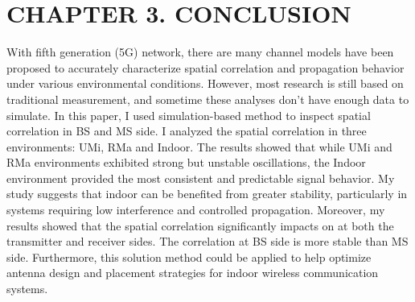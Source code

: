 \documentclass{article} %
\begin{document}
\clearpage

\section*{CHAPTER 3. CONCLUSION}
With fifth generation (5G) network, there are many channel models have been proposed to accurately characterize spatial correlation and propagation behavior under various environmental conditions. However, most research is still based on traditional measurement, and sometime these analyses don’t have enough data to simulate. In this paper, I used simulation-based method to inspect spatial correlation in BS and MS side. I  analyzed the spatial correlation in three environments: UMi, RMa and Indoor. The results showed that while UMi and RMa environments exhibited strong but unstable oscillations, the Indoor environment provided the most consistent and predictable signal behavior. My study suggests that indoor can be benefited from greater stability, particularly in systems requiring low interference and controlled propagation.  Moreover, my results showed that the spatial correlation significantly impacts on at both the transmitter and receiver sides. The correlation at BS side is more stable than MS side.  Furthermore, this solution method could be applied to help optimize antenna design and placement strategies for indoor wireless communication systems.

\clearpage





\end{document}
